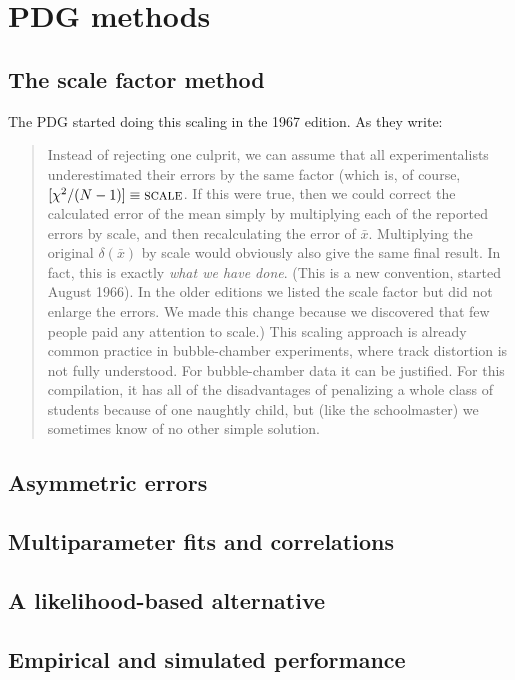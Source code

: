 \documentclass[12pt]{article}
\begin{document}
\FloatBarrier

\section{PDG methods}

\subsection{The scale factor method}

The PDG started doing this scaling in the 1967 edition. As they write:
\begin{quote}
  Instead of rejecting one culprit, we can assume that all experimentalists underestimated their errors by the same factor (which is, of course, $[\chi^2/(N-1)]\equiv \text{\sc{scale}}$. If this were true, then we could correct the calculated error of the mean simply by multiplying each of the reported errors by {\sc scale}, and then recalculating the error of $\bar{x}$. Multiplying the original $\delta(\bar{x})$ by {\sc scale} would obviously also give the same final result. In fact, this is exactly \emph{what we have done}. (This is a {\sc new convention}, started August 1966). In the older editions we listed the {\sc scale} factor but did not enlarge the errors. We made this change because we discovered that few people paid any attention to {\sc scale}.) This scaling approach is already common practice in bubble-chamber experiments, where track distortion is not fully understood. For bubble-chamber data it can be justified. For this compilation, it has all of the disadvantages of penalizing a whole class of students because of one naughtly child, but (like the schoolmaster) we sometimes know of no other simple solution.
\end{quote}

\subsection{Asymmetric errors}

\subsection{Multiparameter fits and correlations}

\subsection{A likelihood-based alternative}

\subsection{Empirical and simulated performance}


\end{document}
